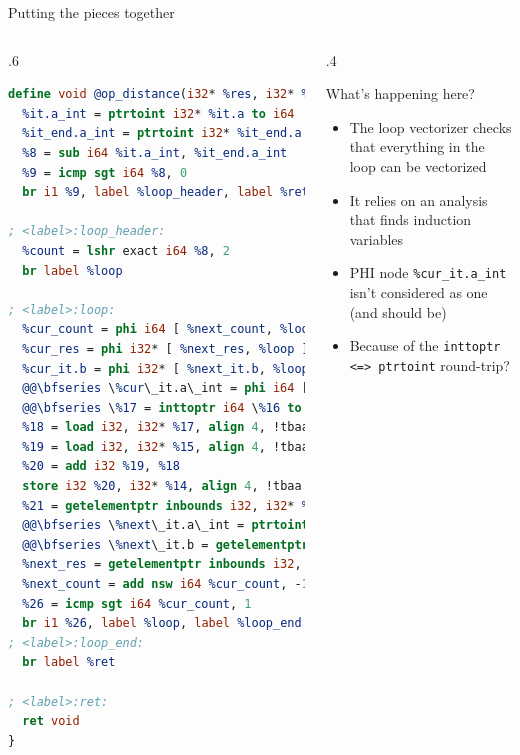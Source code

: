\begin{frame}[fragile,t]{Putting the pieces together}
  \vspace{-1em}
  \begin{columns}[t]
    \begin{column}{.6\textwidth}
      \begin{lstlisting}[language=llvm,basicstyle=\tiny\ttfamily,identifierstyle=\tiny\ttfamily]
define void @op_distance(i32* %res, i32* %it.a, i32* %it.b, i32* %it_end.a, i32* %it_end.b) {
  %it.a_int = ptrtoint i32* %it.a to i64
  %it_end.a_int = ptrtoint i32* %it_end.a to i64
  %8 = sub i64 %it.a_int, %it_end.a_int
  %9 = icmp sgt i64 %8, 0
  br i1 %9, label %loop_header, label %ret

; <label>:loop_header:                              ; preds = %loop, %entry
  %count = lshr exact i64 %8, 2
  br label %loop

; <label>:loop:                                     ; preds = %loop, %loop_header
  %cur_count = phi i64 [ %next_count, %loop ], [ %count, %loop_header ]
  %cur_res = phi i32* [ %next_res, %loop ], [ %res, %loop_header ]
  %cur_it.b = phi i32* [ %next_it.b, %loop ], [ %it.b, %loop_header ]
  @@\bfseries \%cur\_it.a\_int = phi i64 [ \%next\_it.a\_int, \%loop ], [ \%it.a\_int, \%loop\_header ]@
  @@\bfseries \%17 = inttoptr i64 \%16 to i32*@
  %18 = load i32, i32* %17, align 4, !tbaa !1
  %19 = load i32, i32* %15, align 4, !tbaa !1
  %20 = add i32 %19, %18
  store i32 %20, i32* %14, align 4, !tbaa !1
  %21 = getelementptr inbounds i32, i32* %17, i64 1
  @@\bfseries \%next\_it.a\_int = ptrtoint i32* \%21 to i64@
  @@\bfseries \%next\_it.b = getelementptr inbounds i32, i32* \%15, i64 1@
  %next_res = getelementptr inbounds i32, i32* %14, i64 1
  %next_count = add nsw i64 %cur_count, -1
  %26 = icmp sgt i64 %cur_count, 1
  br i1 %26, label %loop, label %loop_end
; <label>:loop_end:                                     ; preds = %loop
  br label %ret

; <label>:ret:                                     ; preds = %loop_end, %entry
  ret void
}
      \end{lstlisting}
    \end{column}
    \begin{column}{.4\textwidth}
      \begin{small}
      \begin{block}{What's happening here?}
        \begin{itemize}
          \item The loop vectorizer checks that everything in the loop can be vectorized
          \item It relies on an analysis that finds induction variables
          \item PHI node {\tt \%cur\_it.a\_int} isn't considered as one (and should be)
          \item Because of the {\tt inttoptr <=> ptrtoint} round-trip?
        \end{itemize}
      \end{block}
      \end{small}
    \end{column}
  \end{columns}
\end{frame}

